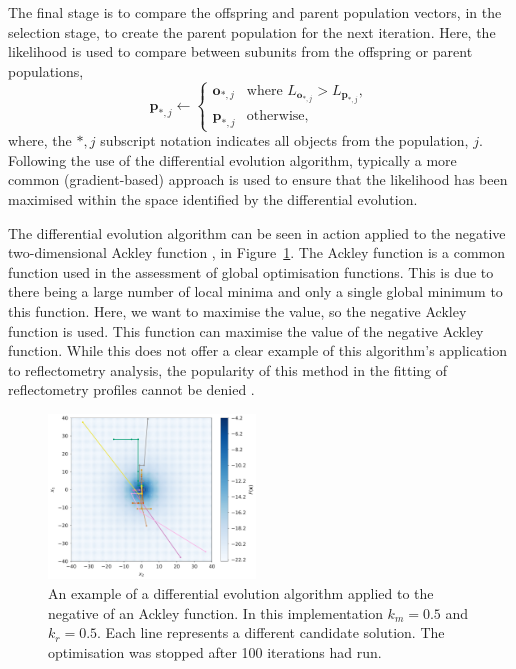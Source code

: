 \documentclass[
 reprint,
 superscriptaddress,
 amsmath,amssymb,
 aps,
]{revtex4-1}
\begin{document}
The final stage is to compare the offspring and parent population vectors, in the selection stage, to create the parent population for the next iteration. 
Here, the likelihood is used to compare between subunits from the offspring or parent populations, 
%
\begin{equation}
    \mathbf{p}_{*, j} \leftarrow 
    \begin{cases}
        \mathbf{o}_{*, j} & \text{where } L_{\mathbf{o}_{*, j}} > L_{\mathbf{p}_{*, j}},\\
        \mathbf{p}_{*, j} & \text{otherwise},
    \end{cases}
\end{equation}
%
where, the $*, j$ subscript notation indicates all objects from the population, $j$.
Following the use of the differential evolution algorithm, typically a more common (gradient-based) approach is used to ensure that the likelihood has been maximised within the space identified by the differential evolution.

The differential evolution algorithm can be seen in action applied to the negative two-dimensional Ackley function \cite{ackley_connectionist_1987}, in Figure~\ref{fig:ackley}.
The Ackley function is a common function used in the assessment of global optimisation functions. This is due to there being a large number of local minima and only a single global minimum to this function. Here, we want to maximise the value, so the negative Ackley function is used.
This function can maximise the value of the negative Ackley function.
While this does not offer a clear example of this algorithm's application to reflectometry analysis, the popularity of this method in the fitting of reflectometry profiles cannot be denied \cite{bjorck_fitting_2011,nelson_refnx_2019}.
%
\begin{figure}[t]
    \includegraphics[width=0.49\textwidth]{ackley}
    \caption{An example of a differential evolution algorithm applied to the negative of an Ackley function. In this implementation $k_m=0.5$ and $k_r=0.5$. Each line represents a different candidate solution. The optimisation was stopped after 100 iterations had run.}
    \label{fig:ackley}
\end{figure}
%
\end{document}
